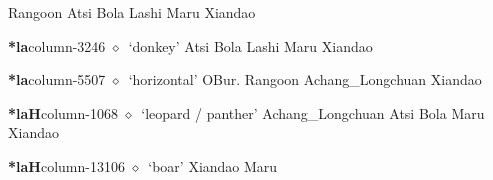 \hspace{1ex}
         Rangoon 
\hspace{1ex}
         Atsi 
\hspace{1ex}
         Bola 
\hspace{1ex}
         Lashi 
\hspace{1ex}
         Maru 
\hspace{1ex}
         Xiandao 
  \item {\footnotesize \textbf{*la}}{\tiny column-3246}
         $\diamond$~`donkey'
         Atsi 
\hspace{1ex}
         Bola 
\hspace{1ex}
         Lashi 
\hspace{1ex}
         Maru 
\hspace{1ex}
         Xiandao 
  \item {\footnotesize \textbf{*la}}{\tiny column-5507}
         $\diamond$~`horizontal'
         OBur. 
\hspace{1ex}
         Rangoon 
\hspace{1ex}
         Achang\_Longchuan 
\hspace{1ex}
         Xiandao 
  \item {\footnotesize \textbf{*laH}}{\tiny column-1068}
         $\diamond$~`leopard / panther'
         Achang\_Longchuan 
\hspace{1ex}
         Atsi 
\hspace{1ex}
         Bola 
\hspace{1ex}
         Maru 
\hspace{1ex}
         Xiandao 
  \item {\footnotesize \textbf{*laH}}{\tiny column-13106}
         $\diamond$~`boar'
         Xiandao 
\hspace{1ex}
         Maru 
